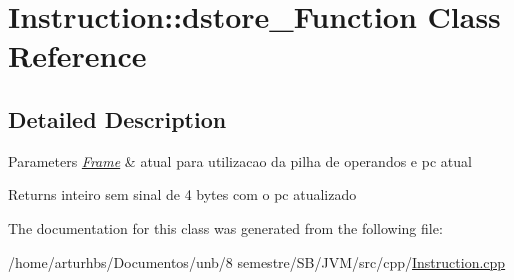 \hypertarget{classInstruction_1_1dstore__2Function}{}\section{Instruction\+:\+:dstore\+\_\+Function Class Reference}
\label{classInstruction_1_1dstore__2Function}


\subsection{Detailed Description}

\begin{DoxyParams}{Parameters}
{\em \hyperlink{classFrame}{Frame}} & atual para utilizacao da pilha de operandos e pc atual \\
\hline
\end{DoxyParams}
\begin{DoxyReturn}{Returns}
inteiro sem sinal de 4 bytes com o pc atualizado 
\end{DoxyReturn}


The documentation for this class was generated from the following file\+:\begin{DoxyCompactItemize}
\item 
/home/arturhbs/\+Documentos/unb/8 semestre/\+S\+B/\+J\+V\+M/src/cpp/\hyperlink{Instruction_8cpp}{Instruction.\+cpp}\end{DoxyCompactItemize}

